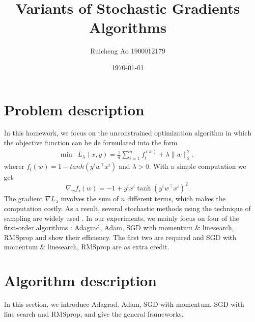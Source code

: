 \documentclass{article}
\title{Variants of Stochastic Gradients Algorithms}
\date{\today}
\author{Ruicheng Ao 1900012179}
\begin{document}
\maketitle
\section{Problem description}
In this homework, we focus on the unconstrained optimization algorithm in which the objective function can be de formulated into the form
\begin{equation}\label{prob}
\begin{array}{cc}
\min &L_\lambda(x,y)=\frac{1}{n}\sum_{i=1}^n f_i^(w)+\lambda\|w\|_2^2,
\end{array}
\end{equation}
wherer $f_i(w) = 1-tanh(y^iw^\top x^i)$ and $\lambda >0$. With a simple computation we get
\begin{equation}\label{grad}
	\nabla_w f_i(w) = -1+y^ix^i\tanh(y^iw^\top x^i)^2.
\end{equation}
The gradient $\nabla L_\lambda $ involves the sum of $n$ different terms, which makes the computation costly. As a result, several stochastic methods using the technique of sampling are widely used \cite[Section 8]{goodfellow2016deep}. In our experiments, we mainly focus on four of the first-order algorithms : Adagrad, Adam, SGD with momentum \& linesearch, RMSprop and show their efficiency. The first two are required and SGD with momentum \& linesearch, RMSprop are as extra credit.
\section{Algorithm description}
In this section, we introduce Adagrad, Adam, SGD with momentum, SGD with line search and RMSprop, and give the general frameworks.
\end{document}
